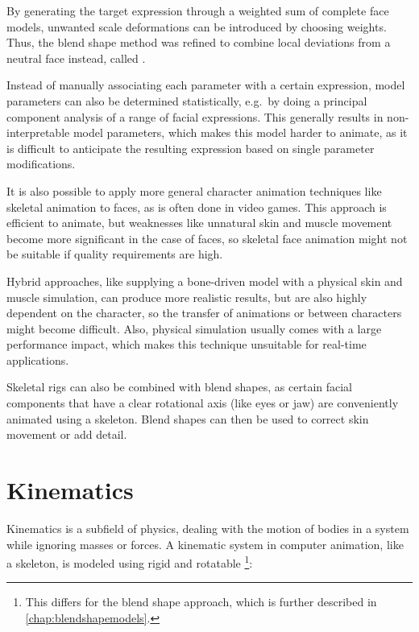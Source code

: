 By generating the target expression through a weighted sum of complete face models,
unwanted scale deformations can be introduced by choosing  weights.
Thus, the blend shape method was refined to combine local deviations from a neutral face instead,
called .

Instead of manually associating each parameter with a certain expression,
model parameters can also be determined statistically,
e.g.\ by doing a principal component analysis of a range of facial expressions.
This generally results in non-interpretable model parameters,
which makes this model harder to animate,
as it is difficult to anticipate the resulting expression based on single parameter modifications.

It is also possible to apply more general character animation techniques like skeletal animation to faces,
as is often done in video games.
This approach is efficient to animate,
but weaknesses like unnatural skin and muscle movement become more significant in the case of faces,
so skeletal face animation might not be suitable if quality requirements are high.

Hybrid approaches,
like supplying a bone-driven model with a physical skin and muscle simulation,
can produce more realistic results,
but are also highly dependent on the character,
so the transfer of animations or  between characters might become difficult.
Also, physical simulation usually comes with a large performance impact,
which makes this technique unsuitable for real-time applications.

Skeletal rigs can also be combined with blend shapes,
as certain facial components that have a clear rotational axis (like eyes or jaw) are conveniently animated using a skeleton.
Blend shapes can then be used to correct skin movement or add detail.

\section{Kinematics}
\label{sec:kinematics}

Kinematics is a subfield of physics, dealing with the motion of bodies in a system while ignoring masses or forces.
A kinematic system in computer animation, like a skeleton, is modeled using rigid  and rotatable \footnote{
  This differs for the blend shape approach,
  which is further described in \autoref{chap:blendshapemodels}.
}:

